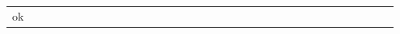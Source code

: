 {\begin{tabular}{rp{0.95\linewidth}}
ok{}\allowbreak{}\charmasktok{}\allowbreak{}\charmasktok{}\allowbreak{}\charmasktok{}\allowbreak{}\charmasktok{}\allowbreak{}\charmasktok{}\allowbreak{}\charmasktok{}\allowbreak{}\charmasktok{}\allowbreak{}\charmasktok{}\allowbreak{}\charmasktok{}\allowbreak{}\charmasktok{}\allowbreak{}\charmasktok{}\allowbreak{}\charmasktok{}\allowbreak{}\charmasktok{}\allowbreak{}\charmasktok{}\allowbreak{}\charmasktok{}\allowbreak{}\charmasktok{}\allowbreak{}\charmasktok{}\allowbreak{}\charmasktok{}\allowbreak{}\charmasktok{}\allowbreak{}\charmasktok{}\allowbreak{}\charmasktok{}\allowbreak{}\charmasktok{}\allowbreak{}\charmasktok{}\allowbreak{}\charmasktok{}\allowbreak{}\charmasktok{}\allowbreak{}\charmasktok{}\allowbreak{}\charmasktok{}\allowbreak{}\charmasktok{}\allowbreak{}\charmasktok{}\allowbreak{}\charmasktok{}\allowbreak{}\charmasktok{}\allowbreak{}\charmasktok{}\allowbreak{}\charmasktok{}\allowbreak{}\charmasktok{}\allowbreak{}\charmasktok{}\allowbreak{}\charmasktok{}\allowbreak{}\charmasktok{}\allowbreak{}\charmasktok{}\allowbreak{}\charmasktok{}\allowbreak{}\charmasktok{}\allowbreak{}\charmasktok{}\allowbreak{}\charmasktok{}\allowbreak{}\charmasktok{}\allowbreak{}\charmasktok{}\allowbreak{}\charmasktok{}\allowbreak{}\charmasktok{}\allowbreak{}\charmasktok{}\allowbreak{}\charmasktok{}\allowbreak{}\charmasktok{}\allowbreak{}\charmasktok{}\allowbreak{}\charmasktok{}\allowbreak{}\charmasktok{}\allowbreak{}\charmasktok{}\allowbreak{}\charmasktok{}\allowbreak{}\charmasktok{}\allowbreak{}\charmasktok{}\allowbreak{}\charmasktok{}\allowbreak{}\charmasktok{}\allowbreak{}\charmasktok{}\allowbreak{}\charmasktok{}\allowbreak{}\charmasktok{}\allowbreak{}\charmasktok{}\allowbreak{}\charmasktok{}\allowbreak{}\charmasktok{}\allowbreak{}\charmasktok{}\allowbreak{}\charmasktok{}\allowbreak{}\charmasktok{}\allowbreak{}\charmasktok{}\allowbreak{}\charmasktok{}\allowbreak{}\charmasktok{}\allowbreak{}\charmasktok{}\allowbreak{}\charmasktok{}\allowbreak{}\charmasktok{}\allowbreak{}\charmasktok{}\allowbreak{}\charmasktok{}\allowbreak{}\charmasktok{}\allowbreak{}\charmasktok{}\allowbreak{}\charmasktok{}\allowbreak{}\charmasktok{}\allowbreak{}\charmasktok{}\allowbreak{}\charmasktok{}\allowbreak{}\charmasktok{}\allowbreak{}\charmasktok{}\allowbreak{}\charmasktok{}\allowbreak{}\charmasktok{}\allowbreak{}\charmasktok{}\allowbreak{}\charmasktok{}\allowbreak{}\charmasktok{}\allowbreak{}\charmasktok{}\allowbreak{}\charmasktok{}\allowbreak{}\charmasktok{}\allowbreak{}\charmasktok{}\allowbreak{}\charmasktok{}\allowbreak{}\charmasktok{}\allowbreak{}\charmasktok{}\allowbreak{}\charmasktok{}\allowbreak{}\charmasktok{}\allowbreak{}\charmasktok{}\allowbreak{}\charmasktok{}\allowbreak{}\charmasktok{}\allowbreak{}\charmasktok{}\allowbreak{}\charmasktok{}\allowbreak{}\charmasktok{}\allowbreak{}\charmasktok{}\allowbreak{}\charmasktok{}\allowbreak{}\charmasktok{}\allowbreak{}\charmasktok{}\allowbreak{}\charmasktok{}\allowbreak{}\charmasktok{}\allowbreak{}\charmasktok{}\allowbreak{}\charmasktok{}\allowbreak{}\charmasktok{}\allowbreak{}\charmasktok{}\allowbreak{}\charmasktok{}\allowbreak{}\charmasktok{}\allowbreak{}\charmasktok{}\allowbreak{}\charmasktok{}\allowbreak{}\charmasktok{}\allowbreak{}\charmasktok{}\allowbreak{}\charmasktok{}\allowbreak{}\charmasktok{}\allowbreak{}\charmasktok{}\
\end{tabular}}
